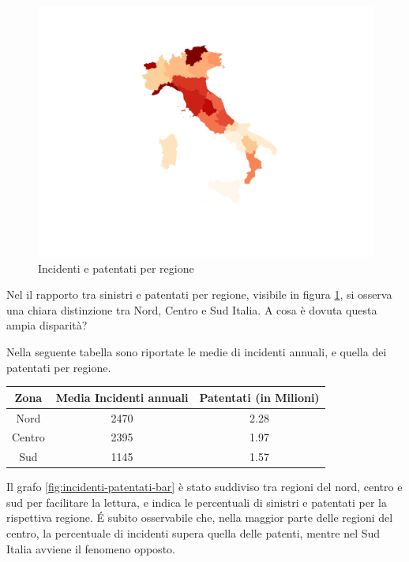 \documentclass[a4paper,12pt]{report}
\begin{document}
\begin{figure}
    \hfill\includegraphics[width=\linewidth]{../src/incidenti/incidenti_aci/mappe_regioni/incidenti_patenti_italia.png}\hspace*{\fill}
    \caption{Incidenti e patentati per regione}
    \label{fig:incidenti-patentati}
\end{figure}

Nel il rapporto tra sinistri e patentati per regione, 
visibile in figura \ref{fig:incidenti-patentati}, 
si osserva una chiara distinzione tra Nord, Centro e Sud Italia. 
A cosa è dovuta questa ampia disparità?

Nella seguente tabella sono riportate le medie di incidenti annuali, 
e quella dei patentati per regione.

\begin{center}
    \def\arraystretch{1.5}%
    \begin{tabular}{ |c|c|c| } 
    \hline
    Zona & Media Incidenti annuali & Patentati (in Milioni) \\ 
    \hline
    \rowcolor{TableGray}
    Nord    &   2470 &   2.28 \\ 
    Centro  &   2395 &   1.97 \\ 
    \rowcolor{TableGray}
    Sud     &   1145 &   1.57 \\ 
    \hline
    \end{tabular}
\end{center}

Il grafo \ref{fig:incidenti-patentati-bar} è stato suddiviso tra regioni del nord, 
centro e sud per facilitare la lettura, e indica le percentuali di sinistri e 
patentati per la rispettiva regione. 
\'E subito osservabile che, nella maggior parte delle regioni del centro, 
la percentuale di incidenti supera quella delle patenti, 
mentre nel Sud Italia avviene il fenomeno opposto.
\end{document}
